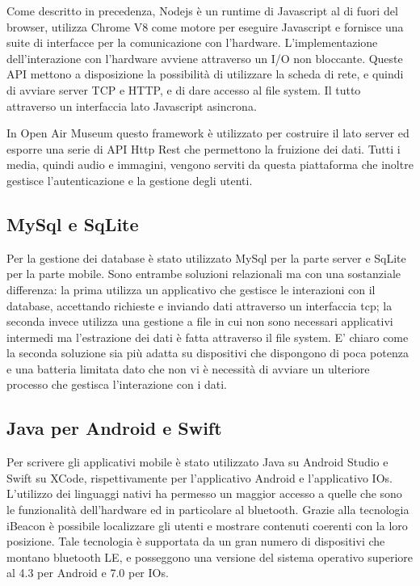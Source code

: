 	Come descritto in precedenza, Nodejs è un runtime di Javascript al di fuori del browser, utilizza Chrome V8\cite{V8} come motore per eseguire Javascript e fornisce una suite di interfacce per la comunicazione con l'hardware. L'implementazione dell'interazione con l'hardware avviene attraverso un I/O non bloccante\cite{AsincIO}. Queste API mettono a disposizione la possibilità di utilizzare la scheda di rete, e quindi di avviare server TCP e HTTP, e di dare accesso al file system. Il tutto attraverso un interfaccia lato Javascript asincrona. \vspace{5mm}
	
	In Open Air Museum questo framework è utilizzato per costruire il lato server ed esporre una serie di API Http Rest che permettono la fruizione dei dati. Tutti i media, quindi audio e immagini, vengono serviti da questa piattaforma che inoltre gestisce l’autenticazione e la gestione degli utenti.\vspace{5mm}
	
	\subsection{MySql e SqLite}\vspace{5mm}
	
	Per la gestione dei database è stato utilizzato MySql per la parte server e SqLite per la parte mobile. Sono entrambe soluzioni relazionali ma con una sostanziale differenza: la prima utilizza un applicativo che gestisce le interazioni con il database, accettando richieste e inviando dati attraverso un interfaccia tcp; la seconda invece utilizza una gestione a file in cui non sono necessari applicativi intermedi ma l'estrazione dei dati è fatta attraverso il file system. E' chiaro come la seconda soluzione sia più adatta su dispositivi che dispongono di poca potenza e una batteria limitata dato che non vi è necessità di avviare un ulteriore processo che gestisca l'interazione con i dati.\vspace{5mm}
	
	\subsection{Java per Android e Swift}\vspace{5mm}
	
	Per scrivere gli applicativi mobile è stato utilizzato Java su Android Studio e Swift su XCode, rispettivamente per l'applicativo Android e l'applicativo IOs. L'utilizzo dei linguaggi nativi ha permesso un maggior accesso a quelle che sono le funzionalità dell'hardware ed in particolare al bluetooth. Grazie alla tecnologia iBeacon è possibile localizzare gli utenti e mostrare contenuti coerenti con la loro posizione. Tale tecnologia è supportata da un gran numero di dispositivi che montano bluetooth LE, e posseggono una versione del sistema operativo superiore al 4.3 per Android e 7.0 per IOs.
	
